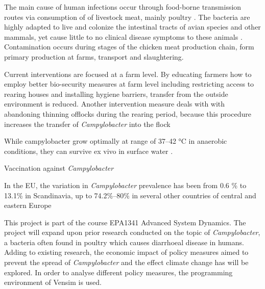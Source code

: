 The main cause of human infections occur through food-borne transmission routes via consumption of of livestock meat, mainly poultry \cite{wilson_tracing_2008}. The bacteria are highly adapted to live and colonize the intestinal tracts of avian species and other mammals, yet cause little to no clinical disease symptoms to these animals \cite{saif_diseases_2008}. Contamination occurs during stages of the chicken meat production chain, form primary production at farms, transport and slaughtering. %

Current interventions are focused at a farm level. By educating farmers how to employ better bio-security measures at farm level including restricting access to rearing houses and installing hygiene barriers, transfer from the outside environment is reduced. Another intervention measure deals with with abandoning thinning offlocks during the rearing period, because this procedure increases the transfer of \textit{Campylobacter} into the flock

While campylobacter grow optimally at range of 37–42 °C \cite{bronowski_role_2014} in anaerobic conditions, they can survive ex vivo in surface water \cite{wilson_tracing_2008}.


Vaccination against \textit{Campylobacter} %


In the EU, the variation in \textit{Campylobacter} prevalence has been from 0.6 \% to 13.1\% in Scandinavia, up to 74.2\%–80\% in  several  other  countries of central and eastern Europe \cite{noauthor_campylobacteriosis_nodate} %


















This project is part of the course EPA1341 Advanced System Dynamics. The project will expand upon prior research conducted on the topic of \textit{Campylobacter}, a bacteria often found in poultry which causes diarrhoeal disease in humans. Adding to existing research, the economic impact of policy measures aimed to prevent the spread of  \textit{Campylobacter} and the effect climate change has will be explored. In order to analyse different policy measures, the programming environment of Vensim is used. 


